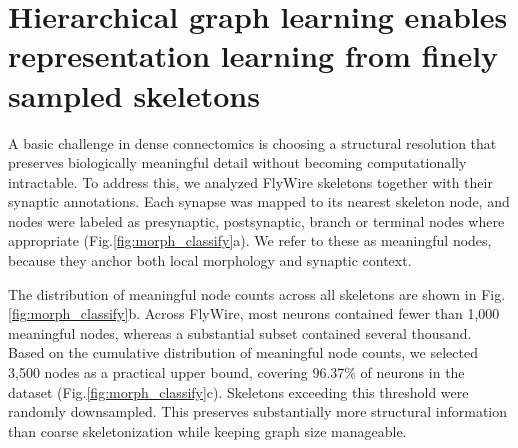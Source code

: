 \documentclass{article}
\begin{document}

\section{Hierarchical graph learning enables representation learning from finely sampled skeletons}


A basic challenge in dense connectomics is choosing a structural resolution that preserves biologically meaningful detail without becoming computationally intractable. To address this, we analyzed FlyWire skeletons together with their synaptic annotations. Each synapse was mapped to its nearest skeleton node, and nodes were labeled as presynaptic, postsynaptic, branch or terminal nodes where appropriate ({Fig.\ref{fig:morph_classify}a}). We refer to these as meaningful nodes, because they anchor both local morphology and synaptic context.

The distribution of meaningful node counts across all skeletons are shown in {Fig.\ref{fig:morph_classify}b}. Across FlyWire, most neurons contained fewer than 1,000 meaningful nodes, whereas a substantial subset contained several thousand. Based on the cumulative distribution of meaningful node counts, we selected 3,500 nodes as a practical upper bound, covering 96.37\% of neurons in the dataset ({Fig.\ref{fig:morph_classify}c}). Skeletons exceeding this threshold were randomly downsampled. This preserves substantially more structural information than coarse skeletonization while keeping graph size manageable.
\end{document}
